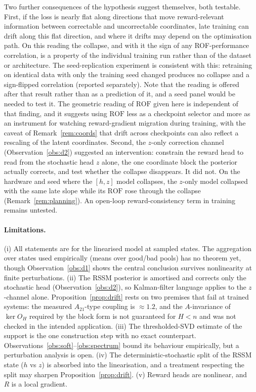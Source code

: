 \documentclass[11pt]{article}
\theoremstyle{remark}
\newcommand{\ROF}{\mathrm{ROF}}
\begin{document}
Two further consequences of the hypothesis suggest themselves, both testable. First, if the loss is nearly flat along directions that move reward-relevant information between correctable and uncorrectable coordinates, late training can drift along this flat direction, and where it drifts may depend on the optimisation path. On this reading the collapse, and with it the sign of any ROF-performance correlation, is a property of the individual training run rather than of the dataset or architecture. The seed-replication experiment is consistent with this: retraining on identical data with only the training seed changed produces no collapse and a sign-flipped correlation (reported separately). Note that the reading is offered after that result rather than as a prediction of it, and a seed panel would be needed to test it. The geometric reading of $\ROF$ given here is independent of that finding, and it suggests using $\ROF$ less as a checkpoint selector and more as an instrument for watching reward-gradient migration during training, with the caveat of Remark~\ref{rem:coords} that drift across checkpoints can also reflect a rescaling of the latent coordinates. Second, the $z$-only correction channel (Observation~\ref{obs:d2}) suggested an intervention: constrain the reward head to read from the stochastic head $z$ alone, the one coordinate block the posterior actually corrects, and test whether the collapse disappears. It did not. On the hardware and seed where the $[h,z]$ model collapses, the $z$-only model collapsed with the same late slope while its $\ROF$ rose through the collapse (Remark~\ref{rem:planning}). An open-loop reward-consistency term in training remains untested.

\paragraph{Limitations.}
(i) All statements are for the linearised model at sampled states. The aggregation over states used empirically (means over good/bad pools) has no theorem yet, though Observation~\ref{obs:d1} shows the central conclusion survives nonlinearity at finite perturbations. (ii) The RSSM posterior is amortised and corrects only the stochastic head (Observation~\ref{obs:d2}), so Kalman-filter language applies to the $z$-channel alone. Proposition~\ref{prop:drift} rests on two premises that fail at trained systems: the measured $A_{21}$-type coupling is $\approx 1.2$, and the $A$-invariance of $\ker O_H$ required by the block form is not guaranteed for $H < n$ and was not checked in the intended application. (iii) The thresholded-SVD estimate of the support is the one construction step with no exact counterpart. Observations~\ref{obs:soft}--\ref{obs:spectrum} bound its behaviour empirically, but a perturbation analysis is open. (iv) The deterministic-stochastic split of the RSSM state ($h$ vs $z$) is absorbed into the linearisation, and a treatment respecting the split may sharpen Proposition~\ref{prop:drift}. (v) Reward heads are nonlinear, and $R$ is a local gradient.
\end{document}
